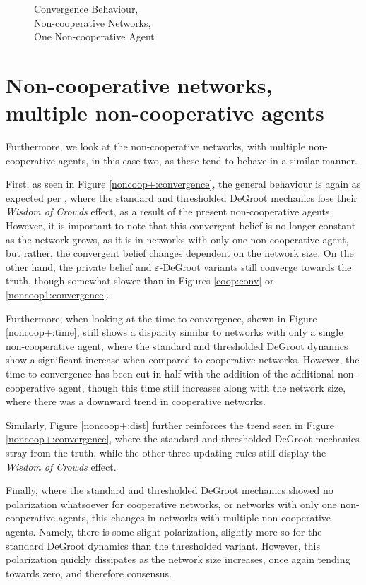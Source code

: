 \documentclass[a4paper, 12pt]{report}
\begin{document}
\begin{figure}[!htbp]
    \caption{Convergence Behaviour, \\ Non-cooperative Networks, \\ One Non-cooperative Agent}
\end{figure}

\newpage

\section{Non-cooperative networks, \\ multiple non-cooperative agents}
\label{results:noncoop+}
Furthermore, we look at the non-cooperative networks, with multiple non-cooperative agents, in this case two, as these tend to behave in a similar manner.

\noindent First, as seen in Figure \ref{noncoop+:convergence}, the general behaviour is again as expected per \cite{amir2021robust}, where the standard and thresholded DeGroot mechanics lose their \emph{Wisdom of Crowds} effect, as a result of the present non-cooperative agents. However, it is important to note that this convergent belief is no longer constant as the network grows, as it is in networks with only one non-cooperative agent, but rather, the convergent belief changes dependent on the network size. On the other hand, the private belief and $\varepsilon$-DeGroot variants still converge towards the truth, though somewhat slower than in Figures \ref{coop:conv} or \ref{noncoop1:convergence}.

\noindent Furthermore, when looking at the time to convergence, shown in Figure \ref{noncoop+:time}, still shows a disparity similar to networks with only a single non-cooperative agent, where the standard and thresholded DeGroot dynamics show a significant increase when compared to cooperative networks. However, the time to convergence has been cut in half with the addition of the additional non-cooperative agent, though this time still increases along with the network size, where there was a downward trend in cooperative networks.

\noindent Similarly, Figure \ref{noncoop+:dist} further reinforces the trend seen in Figure \ref{noncoop+:convergence}, where the standard and thresholded DeGroot mechanics stray from the truth, while the other three updating rules still display the \emph{Wisdom of Crowds} effect.

\noindent Finally, where the standard and thresholded DeGroot mechanics showed no polarization whatsoever for cooperative networks, or networks with only one non-cooperative agents, this changes in networks with multiple non-cooperative agents. Namely, there is some slight polarization, slightly more so for the standard DeGroot dynamics than the thresholded variant. However, this polarization quickly dissipates as the network size increases, once again tending towards zero, and therefore consensus. 
\end{document}
